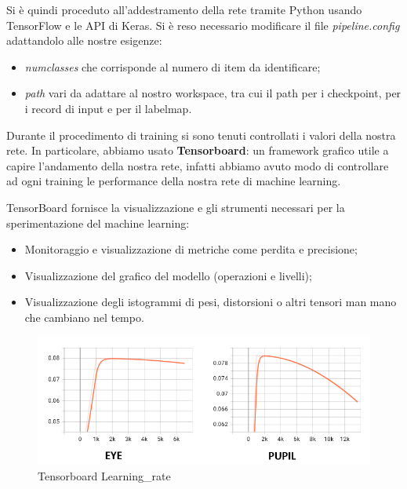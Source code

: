 Si è quindi proceduto all’addestramento della rete tramite Python usando TensorFlow e le API di Keras. Si è reso necessario modificare il file \textit{pipeline.config} adattandolo alle nostre esigenze:

\begin{itemize}
    \item \textit{numclasses} che corrisponde al numero di item da identificare;
    \item \textit{path} vari da adattare al nostro workspace, tra cui il path per i checkpoint, per i record di input e per il labelmap.
\end{itemize}

Durante il procedimento di training si sono tenuti controllati i valori della nostra rete. In particolare, abbiamo usato \textbf{Tensorboard}: un framework grafico utile a capire l'andamento della nostra rete, infatti abbiamo avuto modo di controllare ad ogni training le performance della nostra rete di machine learning.

TensorBoard fornisce la visualizzazione e gli strumenti necessari per la sperimentazione del machine learning:

\begin{itemize}
    \item Monitoraggio e visualizzazione di metriche come perdita e precisione;
    \item Visualizzazione del grafico del modello (operazioni e livelli);
    \item Visualizzazione degli istogrammi di pesi, distorsioni o altri tensori man mano che cambiano nel tempo.
\end{itemize}

\begin{figure}[htbp]
    \centering
    \includegraphics[scale=0.7]{ReteNeurale/EyeDetection/Training/Images/learning_rate_both_edited.png}
    \caption{Tensorboard Learning\_rate}
    \label{fig:eyelearningrate}
\end{figure}

